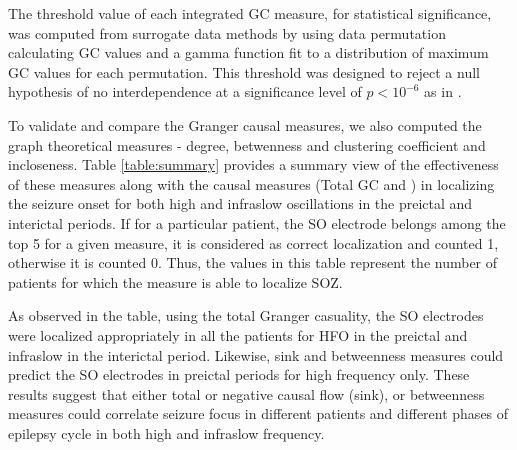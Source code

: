 The threshold value of each integrated GC measure, for statistical significance, was computed from surrogate data methods by using data permutation calculating GC values and a gamma function fit to a distribution of maximum GC values for each permutation. This threshold was designed to reject a null hypothesis of no interdependence at a significance level of $p <10^{-6}$ as in \citep{adhikari2013localizing}.

To validate and compare the Granger causal measures, we also computed the graph theoretical measures - degree, betwenness and clustering coefficient and incloseness. Table \ref{table:summary} provides a summary view of the effectiveness of these measures along with the causal measures (Total GC and ) in localizing the seizure onset for both high and infraslow oscillations in the preictal and interictal periods. If for a particular patient, the SO electrode belongs among the top 5 for a given measure, it is considered as correct localization and counted 1, otherwise it is counted 0. Thus, the values in this table represent the number of patients for which the measure is able to localize SOZ.

As observed in the table, using the total Granger casuality, the SO electrodes were localized appropriately in all the patients for HFO in the preictal and infraslow in the interictal period. Likewise, sink and betweenness measures could predict the SO electrodes in preictal periods for high frequency only. These results suggest that either total or negative causal flow (sink), or betweenness measures could correlate seizure focus in different patients and different phases of epilepsy cycle in both high and infraslow frequency.



